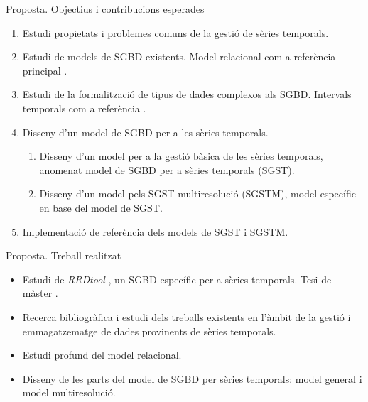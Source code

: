 \begin{frame}{Proposta. Objectius i contribucions esperades}


\begin{enumerate}

  \item Estudi  propietats i problemes comuns de la gestió de sèries temporals.

  \item Estudi de models de SGBD existents.  Model relacional com a
    referència principal \parencite{date:introduction,date06}.

  \item Estudi de la formalització de tipus de dades complexos als
    SGBD. Intervals temporals com a
    referència \parencite{date02:_tempor_data_relat_model}.

  \item Disseny d'un model de SGBD per a les sèries temporals. 

    \begin{enumerate}
    \item Disseny d'un model per a la gestió bàsica de les sèries
      temporals, anomenat model de SGBD per a sèries temporals (SGST).

    \item Disseny d'un model pels SGST multiresolució (SGSTM), model
      específic en base del model de SGST.
    \end{enumerate}

  \item Implementació de referència dels models de SGST i SGSTM. 

\end{enumerate}

\end{frame}





\begin{frame}{Proposta. Treball realitzat}

  \begin{itemize}
  \item Estudi de \emph{RRDtool} \parencite{rrdtool}, un SGBD
    específic per a sèries temporals. Tesi de
    màster \parencite{llusa11:tfm}.

  \item Recerca bibliogràfica i estudi dels treballs existents en
    l'àmbit de la gestió i emmagatzematge de dades provinents de
    sèries temporals.

  \item Estudi profund del model relacional. 

  \item Disseny de les parts del model de SGBD per sèries temporals:
    model general i model multiresolució.

  \end{itemize}

\end{frame}



